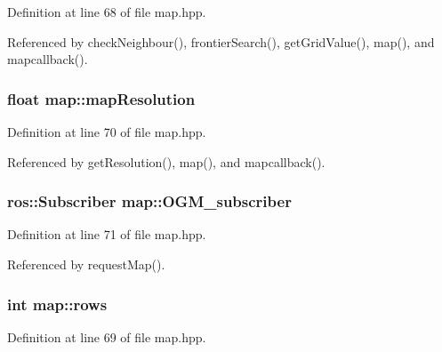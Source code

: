 Definition at line 68 of file map.\+hpp.



Referenced by check\+Neighbour(), frontier\+Search(), get\+Grid\+Value(), map(), and mapcallback().

\subsubsection[{\texorpdfstring{map\+Resolution}{mapResolution}}]{\setlength{\rightskip}{0pt plus 5cm}float map\+::map\+Resolution\hspace{0.3cm}{\ttfamily [private]}}\hypertarget{classmap_ab2c38de30b06b80ec0a6ce646056d33a}{}\label{classmap_ab2c38de30b06b80ec0a6ce646056d33a}


Definition at line 70 of file map.\+hpp.



Referenced by get\+Resolution(), map(), and mapcallback().

\subsubsection[{\texorpdfstring{O\+G\+M\+\_\+subscriber}{OGM_subscriber}}]{\setlength{\rightskip}{0pt plus 5cm}ros\+::\+Subscriber map\+::\+O\+G\+M\+\_\+subscriber\hspace{0.3cm}{\ttfamily [private]}}\hypertarget{classmap_ae40cfd9b303640dfc7a56e198056d2a0}{}\label{classmap_ae40cfd9b303640dfc7a56e198056d2a0}


Definition at line 71 of file map.\+hpp.



Referenced by request\+Map().

\subsubsection[{\texorpdfstring{rows}{rows}}]{\setlength{\rightskip}{0pt plus 5cm}int map\+::rows\hspace{0.3cm}{\ttfamily [private]}}\hypertarget{classmap_a2ee828fe96a115fe070e8ff8eea7b488}{}\label{classmap_a2ee828fe96a115fe070e8ff8eea7b488}


Definition at line 69 of file map.\+hpp.



